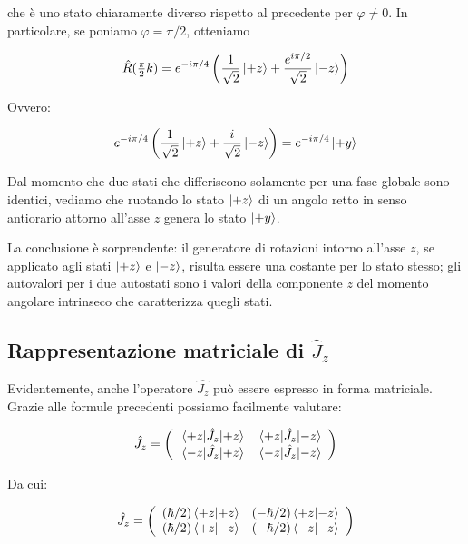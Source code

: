 che \`e uno stato chiaramente diverso rispetto al precedente per $\varphi \neq 0$. In particolare, se poniamo $\varphi = \pi / 2$, otteniamo

	\begin{equation}
		\hat{R}(\tfrac{\pi}{2} k) = e^{-i \pi / 4} \left ( \frac{1}{\sqrt{2}} \ket{+z} + \frac{e^{i \pi / 2}}{\sqrt{2}} \ket{-z} \right )	
	\end{equation}

Ovvero:

	\begin{equation}
		e^{-i \pi / 4} \left( \frac{1}{\sqrt{2}} \ket{+z} + \frac{i}{\sqrt{2}} \ket{-z} \right ) = e^{-i \pi / 4} \ket{+y}
	\end{equation}

Dal momento che due stati che differiscono solamente per una fase globale sono identici, vediamo che ruotando lo stato $\ket{+z}$ di un angolo retto in senso antiorario attorno all'asse $z$ genera lo stato $\ket{+y}$.

La conclusione \`e sorprendente: il generatore di rotazioni intorno all'asse $z$, se applicato agli stati $\ket{+z}$ e $\ket{-z}$, risulta essere una costante per lo stato stesso; gli autovalori per i due autostati sono i valori della componente $z$ del momento angolare intrinseco che caratterizza quegli stati.

\subsection{Rappresentazione matriciale di $\hat{J}_z$}

Evidentemente, anche l'operatore $\hat{J_z}$ pu\`o essere espresso in forma matriciale. Grazie alle formule precedenti possiamo facilmente valutare:

	\begin{equation}
		\hat{J}_z = 
			\left( \begin{array}{c c}
				\mel{+z}{\hat{J}_z}{+z} & \mel{+z}{\hat{J}_z}{-z} \\
				\mel{-z}{\hat{J}_z}{+z} & \mel{-z}{\hat{J}_z}{-z} \\
			\end{array}
		\right )
	\end{equation}

Da cui:	

	\begin{equation}
		\hat{J}_z = 
			\left( \begin{array}{c c}
				(\hbar / 2) \braket{+z}{+z} & (- \hbar / 2) \braket{+z}{-z} \\
				(\hbar / 2) \braket{+z}{-z} & (- \hbar / 2) \braket{-z}{-z} 
			\end{array}
		\right )
	\end{equation}

